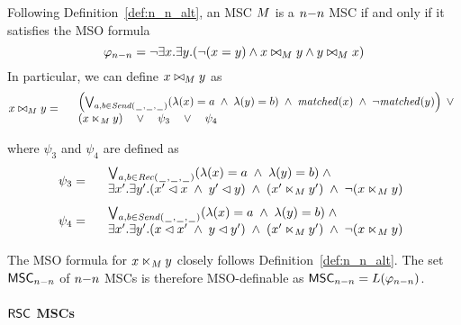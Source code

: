 \documentclass{article}
\begin{document}
Following Definition~\ref{def:n_n_alt}, an MSC $M$ is a $n\mathsf{-}n$ MSC if and only if it satisfies the MSO formula
\[
	\varphi_{n\mathsf{-}n} = \neg \exists x.\exists y.(\neg (x = y) \wedge x \bowtie_M y \wedge y \bowtie_M x)
\]
In particular, we can define $x \bowtie_M y$ as
\[
	x \bowtie_M y =
	\begin{array}{rl}
	& \left(
		\bigvee_{\substack{a,b \in {\mathit{Send}(\hspace{0.1em}\underline{\hspace{0.5em}}\hspace{0.1em},\hspace{0.1em}\underline{\hspace{0.5em}}\hspace{0.1em},\hspace{0.1em}\underline{\hspace{0.5em}}\hspace{0.1em})}}}
		(\lambda(x) = a \;\wedge\; \lambda(y) = b)
		\;\wedge\; \mathit{matched}(x) \;\wedge\; \neg \mathit{matched}(y)
	\right) \;\vee\\
	& (x \ltimes_M y) \quad \vee \quad \psi_3 \quad \vee \quad \psi_4\\
	\end{array}
\]

\noindent where $\psi_3$ and $\psi_4$ are defined as 
\[
	\psi_3 =
	\begin{array}{rl}
		& \bigvee_{\substack{a,b \in {\mathit{Rec}(\hspace{0.1em}\underline{\hspace{0.5em}}\hspace{0.1em},\hspace{0.1em}\underline{\hspace{0.5em}}\hspace{0.1em},\hspace{0.1em}\underline{\hspace{0.5em}}\hspace{0.1em})}}}
		  (\lambda(x) = a \;\wedge\; \lambda(y) = b)
		  \;\wedge\; \\
		& \exists x'.\exists y'.(x' \lhd x \;\wedge\; y' \lhd y) \;\wedge\; (x' \ltimes_M y') \;\wedge\; \neg(x \ltimes_M y)\\
	\end{array}
\]
\[
	\psi_4 =
	\begin{array}{rl}
		& \bigvee_{\substack{a,b \in {\mathit{Send}(\hspace{0.1em}\underline{\hspace{0.5em}}\hspace{0.1em},\hspace{0.1em}\underline{\hspace{0.5em}}\hspace{0.1em},\hspace{0.1em}\underline{\hspace{0.5em}}\hspace{0.1em})}}}
		  (\lambda(x) = a \;\wedge\; \lambda(y) = b)
		  \;\wedge\; \\
		& \exists x'.\exists y'.(x \lhd x' \;\wedge\; y \lhd y') \;\wedge\; (x' \ltimes_M y') \;\wedge\; \neg(x \ltimes_M y)\\
	\end{array}
\]

The MSO formula for $x \ltimes_M y$ closely follows Definition~\ref{def:n_n_alt}. The set $\mathsf{MSC}_{n\mathsf{-}n}$ of $n\mathsf{-}n$ MSCs is therefore MSO-definable as $\mathsf{MSC}_{n\mathsf{-}n}=L(\varphi_{n\mathsf{-}n})$.

\paragraph*{$\mathsf{RSC}$ MSCs}
\end{document}
